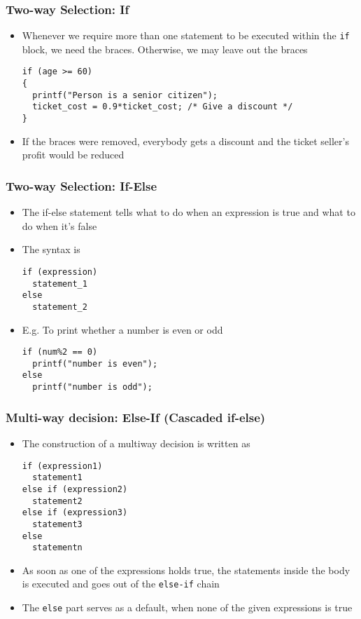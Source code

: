 \documentclass[11pt]{beamer}
\begin{document}
\begin{frame}[fragile]\frametitle{Two-way Selection: If}
\label{sec-1-3}

\begin{itemize}
\item Whenever we require more than one statement to be executed within the \verb~if~ block, we need the braces. Otherwise, we may leave out the braces

\begin{verbatim}
if (age >= 60)
{
  printf("Person is a senior citizen");
  ticket_cost = 0.9*ticket_cost; /* Give a discount */
}
\end{verbatim}
\item If the braces were removed, everybody gets a discount and the ticket seller's profit would be reduced
\end{itemize}
\end{frame}
\begin{frame}[fragile]\frametitle{Two-way Selection: If-Else}
\label{sec-1-4}

\begin{itemize}
\item The if-else statement tells what to do when an expression is true and what to do when it's false
\item The syntax is

\begin{verbatim}
if (expression)
  statement_1
else
  statement_2
\end{verbatim}
\item E.g. To print whether a number is even or odd

\begin{verbatim}
if (num%2 == 0)
  printf("number is even");
else
  printf("number is odd");
\end{verbatim}
\end{itemize}
\end{frame}
\begin{frame}[fragile]\frametitle{Multi-way decision: Else-If (Cascaded if-else)}
\label{sec-1-5}

\begin{itemize}
\item The construction of a multiway decision is written as

\begin{verbatim}
if (expression1)
  statement1
else if (expression2)
  statement2
else if (expression3)
  statement3
else
  statementn
\end{verbatim}
\item As soon as one of the expressions holds true, the statements inside the body is executed and goes out of the \verb~else-if~ chain
\item The \verb~else~ part serves as a default, when none of the given expressions is true
\end{itemize}
\end{frame}
\end{document}
